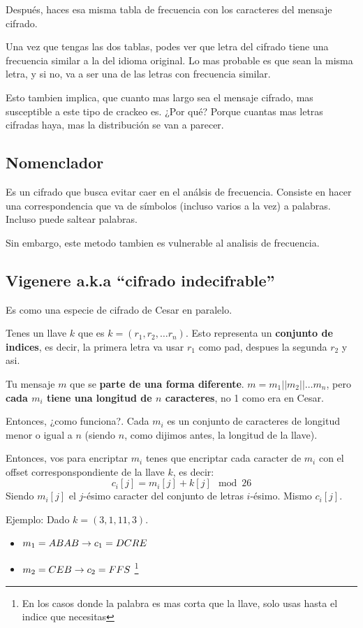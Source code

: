 \documentclass[12pt,a4paper]{report}
\begin{document}
Después, haces esa misma tabla de frecuencia con los caracteres del mensaje cifrado.

Una vez que tengas las dos tablas, podes ver que letra del cifrado tiene una frecuencia similar a la del idioma original. Lo mas probable es que sean la misma letra, y si no, va a ser una de las letras con frecuencia similar.

Esto tambien implica, que cuanto mas largo sea el mensaje cifrado, mas susceptible a este tipo de crackeo es. ¿Por qué? Porque cuantas mas letras cifradas haya, mas la distribución se van a parecer.

\subsection{Nomenclador}
Es un cifrado que busca evitar caer en el análsis de frecuencia. Consiste en hacer una correspondencia que va de símbolos (incluso varios a la vez) a palabras. Incluso puede saltear palabras.

Sin embargo, este metodo tambien es vulnerable al analisis de frecuencia.

\subsection{Vigenere a.k.a ``cifrado indecifrable''}
Es como una especie de cifrado de Cesar en paralelo.

Tenes un llave $k$ que es $k = (r_1, r_2, \dots r_n)$. Esto representa un \textbf{conjunto de indices}, es decir, la primera letra va usar $r_1$ como pad, despues la segunda $r_2$ y asi.

Tu mensaje $m$ que se \textbf{parte de una forma diferente}. $m = m_1 || m_2 || \dots m_n$, pero \textbf{cada $m_i$ tiene una longitud de $n$ caracteres}, no 1 como era en Cesar.

Entonces, ¿como funciona?. Cada $m_i$ es un conjunto de caracteres de longitud menor o igual a $n$ (siendo $n$, como dijimos antes, la longitud de la llave).

Entonces, vos para encriptar $m_i$ tenes que encriptar cada caracter de $m_i$ con el offset corresponspondiente de la llave $k$, es decir:
$$
c_i[j] = m_i[j] + k[j] \mod 26
$$
Siendo $m_i[j]$ el $j$-ésimo caracter del conjunto de letras $i$-ésimo. Mismo $c_i[j]$.

Ejemplo: Dado $k = (3,1,11,3)$.

\begin{itemize}
\item $m_1 = ABAB \rightarrow c_1 = DCRE $
\item $m_2 = CEB \rightarrow c_2 = FFS $ \footnote{En los casos donde la palabra es mas corta que la llave, solo usas hasta el indice que necesitas}
\end{itemize}
\end{document}
